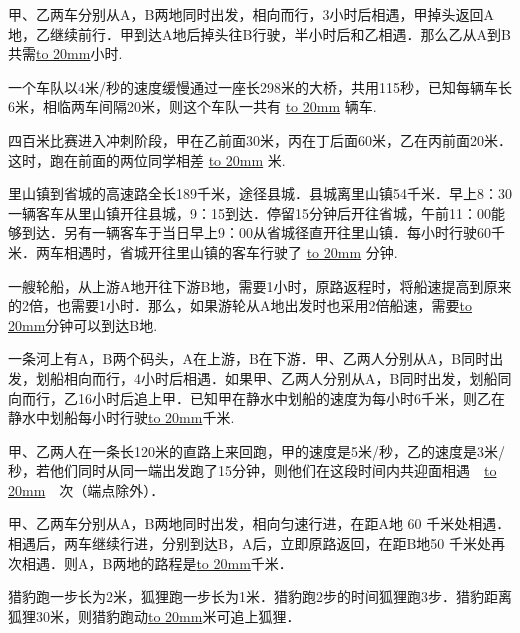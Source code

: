 \item {
    甲、乙两车分别从A，B两地同时出发，相向而行，3小时后相遇，甲掉头返回A地，乙继续前行．甲到达A地后掉头往B行驶，半小时后和乙相遇．那么乙从A到B共需\underline{\hbox to 20mm{}}小时.
    \vspace{2cm}
}

\item {
    一个车队以4米/秒的速度缓慢通过一座长298米的大桥，共用115秒，已知每辆车长6米，相临两车间隔20米，则这个车队一共有 \underline{\hbox to 20mm{}} 辆车.
    \vspace{2cm}
}

\item {
    四百米比赛进入冲刺阶段，甲在乙前面30米，丙在丁后面60米，乙在丙前面20米．这时，跑在前面的两位同学相差 \underline{\hbox to 20mm{}} 米.
    \vspace{2cm}
}

\item {
    里山镇到省城的高速路全长189千米，途径县城．县城离里山镇54千米．早上8：30一辆客车从里山镇开往县城，9：15到达．停留15分钟后开往省城，午前11：00能够到达．另有一辆客车于当日早上9：00从省城径直开往里山镇．每小时行驶60千米．两车相遇时，省城开往里山镇的客车行驶了 \underline{\hbox to 20mm{}} 分钟.
    \vspace{2cm}
}

\item {
    一艘轮船，从上游A地开往下游B地，需要1小时，原路返程时，将船速提高到原来的2倍，也需要1小时．那么，如果游轮从A地出发时也采用2倍船速，需要\underline{\hbox to 20mm{}}分钟可以到达B地.
    \vspace{2cm}
}

\item {
    一条河上有A，B两个码头，A在上游，B在下游．甲、乙两人分别从A，B同时出发，划船相向而行，4小时后相遇．如果甲、乙两人分别从A，B同时出发，划船同向而行，乙16小时后追上甲．已知甲在静水中划船的速度为每小时6千米，则乙在静水中划船每小时行驶\underline{\hbox to 20mm{}}千米.
    \vspace{2cm}
}

\item {
    甲、乙两人在一条长120米的直路上来回跑，甲的速度是5米/秒，乙的速度是3米/秒，若他们同时从同一端出发跑了15分钟，则他们在这段时间内共迎面相遇　\underline{\hbox to 20mm{}}　次（端点除外）．
    \vspace{2cm}
}

\item {
    甲、乙两车分别从A，B两地同时出发，相向匀速行进，在距A地 60 千米处相遇．相遇后，两车继续行进，分别到达B，A后，立即原路返回，在距B地50 千米处再次相遇．则A，B两地的路程是\underline{\hbox to 20mm{}}千米．
    \vspace{2cm}
}

\item {
    猎豹跑一步长为2米，狐狸跑一步长为1米．猎豹跑2步的时间狐狸跑3步．猎豹距离狐狸30米，则猎豹跑动\underline{\hbox to 20mm{}}米可追上狐狸．
    \vspace{2cm}
}